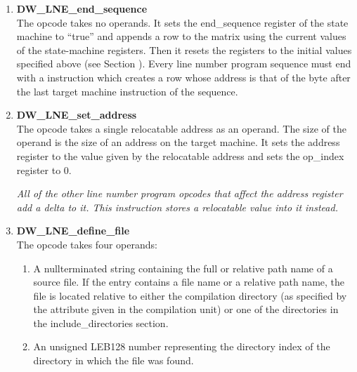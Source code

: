 \begin{enumerate}[1.]

\item \textbf{DW\-\_LNE\-\_end\-\_sequence} \\
The  opcode takes no operands. It sets the
end\_sequence register of the state machine to “true” and
appends a row to the matrix using the current values of the
state-machine registers. Then it resets the registers to the
initial values specified above 
(see Section ). 
Every line
number program sequence must end with a 
instruction which creates a row whose address is that of the
byte after the last target machine instruction of the sequence.

\item \textbf{DW\-\_LNE\-\_set\-\_address} \\
The  opcode takes a single relocatable
address as an operand. The size of the operand is the size
of an address on the target machine. It sets the address
register to the value given by the relocatable address and
sets the op\_index register to 0.

\textit{All of the other line number program opcodes that
affect the address register add a delta to it. This instruction
stores a relocatable value into it instead.}


\item \textbf{DW\-\_LNE\-\_define\-\_file} \\

The  opcode takes four operands:

\begin{enumerate}[1.]

\item A null\dash terminated string containing the full or relative
path name of a source file. If the entry contains a file
name or a relative path name, the file is located relative
to either the compilation directory (as specified by the
 attribute given in the compilation unit)
or one of the directories in the include\_directories section.

\item An unsigned LEB128 number representing the directory index
of the directory in which the file was found.  


\end{enumerate}
\end{enumerate}
